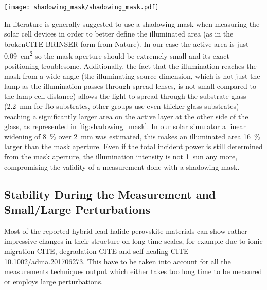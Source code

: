 \begin{SCfigure}
	\centering
	\texttt{[image: shadowing\_mask/shadowing\_mask.pdf]}
	\label{fig:shadowing_mask}
\end{SCfigure}

In literature is generally suggested to use a shadowing mask when measuring the solar cell devices in order to better define the illuminated area (as in the brokenCITE BRINSER form from Nature\cite{NatureResearch2017}). %
In our case the active area is just \SI{0.09}{\square\cm} so the mask aperture should be extremely small and its exact positioning troublesome. Additionally, the fact that the illumination reaches the mask from a wide angle (the illuminating source dimension, which is not just the lamp as the illumination passes through spread lenses, is not small compared to the lamp-cell distance) allows the light to spread through the substrate glass (\SI{2.2}{\mm} for \gls{fto} substrates, other groups use even thicker glass substrates) reaching a significantly larger area on the active layer at the other side of the glass, as represented in \cref{fig:shadowing_mask}. In our solar simulator a linear widening of 8~\% over \SI{2}{\mm} was estimated, this makes an illuminated area 16~\% larger than the mask aperture. Even if the total incident power is still determined from the mask aperture, the illumination intensity is not 1~sun any more, compromising the validity of a measurement done with a shadowing mask.


\subsection{Stability During the Measurement and Small/Large Perturbations}

Most of the reported hybrid lead halide perovskite materials can show rather impressive changes in their structure on long time scales, for example due to ionic migration CITE, degradation CITE and self-healing CITE 10.1002/adma.201706273.
This have to be taken into account for all the measurements techniques output which either takes too long time to be measured or employs large perturbations.


